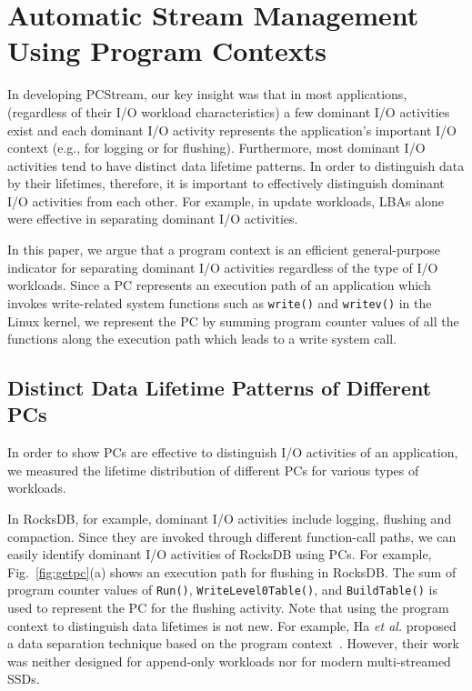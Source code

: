 \section{Automatic Stream Management Using Program Contexts}

In developing \textsf{\small PCStream}, our key insight was that in most applications,
(regardless of their I/O workload characteristics)
a few dominant I/O activities exist
and each dominant I/O activity   
represents the application's important I/O context (e.g., for logging or for flushing). 
Furthermore, most dominant I/O activities tend to have distinct data lifetime patterns.
In order to distinguish data by their lifetimes, therefore, 
it is important to effectively distinguish dominant I/O activities from each other.  
For example, in update workloads, 
LBAs alone were effective in separating dominant I/O activities.  

In this paper, we argue that a program context is an efficient general-purpose
indicator for separating dominant I/O activities regardless of the type of I/O
workloads.  Since a PC represents an execution path of an application which
invokes write-related system functions such as {\tt write()} and {\tt writev()}
in the Linux kernel,  we represent the PC by summing program counter values of
all the functions along the execution path which leads to a write system call.

\subsection{Distinct Data Lifetime Patterns of Different PCs}
In order to show PCs are effective to distinguish I/O activities of
an application, we measured the lifetime distribution of different PCs for various
types of workloads.

In RocksDB, for example, dominant I/O activities include logging, flushing and
compaction.  Since they are invoked through different function-call paths, we
can easily identify dominant I/O activities of RocksDB using PCs.  For example,
Fig.~\ref{fig:getpc}(a) shows an execution path for flushing in RocksDB.  The
sum of program counter values of \texttt{Run()}, \texttt{WriteLevel0Table()},
and \texttt{BuildTable()} is used to represent the PC for the flushing
activity. Note that using the program context to distinguish data lifetimes is
not new. For example, Ha {\it et al.} proposed a data separation technique
based on the program context~\cite{PCHa}.  However, their work was neither
designed for append-only workloads nor for modern multi-streamed SSDs.

